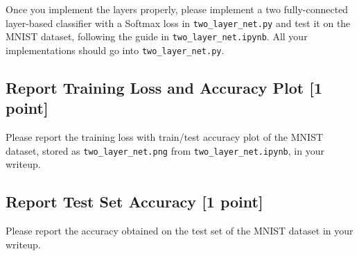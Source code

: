 \documentclass[lang=cn,11pt]{elegantbook}
\begin{document}
Once you implement the layers properly, please implement a two fully-connected layer-based classifier with a Softmax loss in \texttt{two\_layer\_net.py} and test it on the MNIST dataset, following the guide in \texttt{two\_layer\_net.ipynb}. All your implementations should go into \texttt{two\_layer\_net.py}.

\subsection*{Report Training Loss and Accuracy Plot [1 point]}

Please report the training loss with train/test accuracy plot of the MNIST dataset, stored as \texttt{two\_layer\_net.png} from \texttt{two\_layer\_net.ipynb}, in your writeup.

\subsection*{Report Test Set Accuracy [1 point]}

Please report the accuracy obtained on the test set of the MNIST dataset in your writeup.
\end{document}
